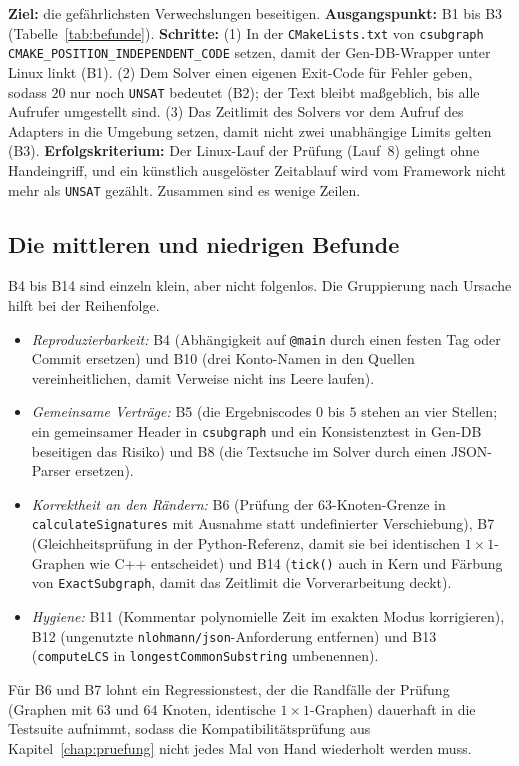 \textbf{Ziel:} die gefährlichsten Verwechslungen beseitigen. \textbf{Ausgangspunkt:} B1 bis B3 (Tabelle~\ref{tab:befunde}). \textbf{Schritte:} (1) In der \texttt{CMakeLists.txt} von \texttt{csubgraph} \texttt{CMAKE\_POSITION\_INDEPENDENT\_CODE} setzen, damit der Gen-DB-Wrapper unter Linux linkt (B1). (2) Dem Solver einen eigenen Exit-Code für Fehler geben, sodass $20$ nur noch \texttt{UNSAT} bedeutet (B2); der Text bleibt maßgeblich, bis alle Aufrufer umgestellt sind. (3) Das Zeitlimit des Solvers vor dem Aufruf des Adapters in die Umgebung setzen, damit nicht zwei unabhängige Limits gelten (B3). \textbf{Erfolgskriterium:} Der Linux-Lauf der Prüfung (Lauf~8) gelingt ohne Handeingriff, und ein künstlich ausgelöster Zeitablauf wird vom Framework nicht mehr als \texttt{UNSAT} gezählt. Zusammen sind es wenige Zeilen.

\subsection{Die mittleren und niedrigen Befunde}

B4 bis B14 sind einzeln klein, aber nicht folgenlos. Die Gruppierung nach Ursache hilft bei der Reihenfolge.
\begin{itemize}
	\item \emph{Reproduzierbarkeit:} B4 (Abhängigkeit auf \texttt{@main} durch einen festen Tag oder Commit ersetzen) und B10 (drei Konto-Namen in den Quellen vereinheitlichen, damit Verweise nicht ins Leere laufen).
	\item \emph{Gemeinsame Verträge:} B5 (die Ergebniscodes $0$ bis $5$ stehen an vier Stellen; ein gemeinsamer Header in \texttt{csubgraph} und ein Konsistenztest in Gen-DB beseitigen das Risiko) und B8 (die Textsuche im Solver durch einen JSON-Parser ersetzen).
	\item \emph{Korrektheit an den Rändern:} B6 (Prüfung der $63$-Knoten-Grenze in \texttt{calculateSignatures} mit Ausnahme statt undefinierter Verschiebung), B7 (Gleichheitsprüfung in der Python-Referenz, damit sie bei identischen $1{\times}1$-Graphen wie C++ entscheidet) und B14 (\texttt{tick()} auch in Kern und Färbung von \texttt{ExactSubgraph}, damit das Zeitlimit die Vorverarbeitung deckt).
	\item \emph{Hygiene:} B11 (Kommentar \glqq polynomielle Zeit\grqq{} im exakten Modus korrigieren), B12 (ungenutzte \texttt{nlohmann/json}-Anforderung entfernen) und B13 (\texttt{computeLCS} in \texttt{longestCommonSubstring} umbenennen).
\end{itemize}
Für B6 und B7 lohnt ein Regressionstest, der die Randfälle der Prüfung (Graphen mit $63$ und $64$ Knoten, identische $1{\times}1$-Graphen) dauerhaft in die Testsuite aufnimmt, sodass die Kompatibilitätsprüfung aus Kapitel~\ref{chap:pruefung} nicht jedes Mal von Hand wiederholt werden muss.

